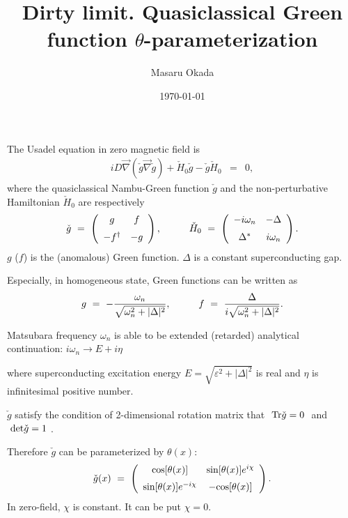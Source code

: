 \documentclass[uplatex,a4j,12pt,dvipdfmx]{jsarticle}
\title{
Dirty limit. Quasiclassical Green function $\theta$-parameterization
}
\author{Masaru Okada}
\date{\today}
\begin{document}
\maketitle

The Usadel equation in zero magnetic field is
\begin{eqnarray}
	i D \vec{\nabla} ( \check{g} \vec{\nabla} \check{g} )
	+ \check{H}_{0} \check{g} - \check{g} \check{H}_{0}
	&=&
	0
	,
\end{eqnarray}
where the quasiclassical Nambu-Green function $\check{g}$ and the non-perturbative Hamiltonian $\check{H}_{0}$ are respectively
\begin{eqnarray}
	\check{g}
	\ = \
	\left(
	\begin{array}{cc}
			g             & f  \\[2mm]
			- f^{\dagger} & -g
		\end{array}
	\right)
	,
	\hspace{10mm}
	\check{H}_{0}
	\ = \
	\left(
	\begin{array}{cc}
			- i \omega_{n} & - \Delta     \\[2mm]
			\Delta^{*}     & i \omega_{n}
		\end{array}
	\right)
	.
\end{eqnarray}
$g$ ($f$) is the (anomalous) Green function.
$\Delta$ is a constant superconducting gap.

Especially, in homogeneous state, Green functions can be written as
\begin{eqnarray}
	g
	\ = \
	- \dfrac{\omega_{n}}{\sqrt{\omega_{n}^{2} + |\Delta|^{2} }}
	,
	\hspace{10mm}
	f
	\ = \
	\dfrac{\Delta}{i \sqrt{\omega_{n}^{2} + |\Delta|^{2} }}
	.
\end{eqnarray}

Matsubara frequency $\omega_{n}$ is able to be extended (retarded) analytical continuation:
$i \omega_{n} \to E + i \eta$

where superconducting excitation energy $E = \sqrt{\varepsilon^{2} + |\Delta|^{2}} $ is real and $\eta$ is infinitesimal positive number.

$\check{g}$ satisfy the condition of 2-dimensional rotation matrix that $ \ {\rm Tr} \check{g} = 0 \ $ and $ \ {\rm det} \check{g} = 1 \ $.

Therefore $\check{g}$ can be parameterized by $\theta(x)$:
\begin{eqnarray}
	\check{g}(x)
	\ = \
	\left(
	\begin{array}{cc}
			{\rm cos} [\theta(x)]              & {\rm sin} [\theta(x)] e^{i \chi} \\[2mm]
			{\rm sin} [\theta(x)] e^{- i \chi} & -{\rm cos} [\theta(x)]
		\end{array}
	\right)
	.
\end{eqnarray}
In zero-field, $\chi$ is constant.
It can be put $\chi=0$.
\end{document}
